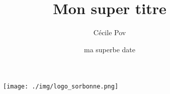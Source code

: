 \documentclass[table]{report}
\title{Mon super titre}
\date{ma superbe date}
\author{Cécile Pov}
\begin{document}


%

\thispagestyle{empty}

\begin{figure}[t]


\endminipage\hfill
{}
  \texttt{[image: ./img/logo\_sorbonne.png]}
\endminipage\hfill
{}
\hspace*{2.2cm}
\vspace*{0.3cm}
  
\endminipage
\end{figure}
\end{document}

